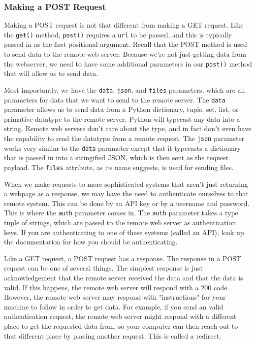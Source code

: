 \subsubsection{Making a POST Request}
Making a POST request is not that different from making a GET request. Like the \verb|get()| method, \verb|post()| requires a \verb|url| to be passed, and this is typically passed in as the first positional argument. Recall that the POST method is used to send data to the remote web server. Because we're not just getting data from the webserver, we need to have some additional parameters in our \verb|post()| method that will allow us to send data.\par
Most importantly, we have the \verb|data|, \verb|json|, and \verb|files| parameters, which are all parameters for data that we want to send to the remote server. The \verb|data| parameter allows us to send data from a Python dictionary, tuple, set, list, or primative datatype to the remote server. Python will typecast any data into a string. Remote web servers don't care about the type, and in fact don't even have the capability to read the datatype from a remote request. The \verb|json| parameter works very similar to the \verb|data| parameter except that it typecasts a dictionary that is passed in into a stringified JSON, which is then sent as the request payload. The \verb|files| attribute, as its name suggests, is used for sending files.\par
When we make requests to more sophisticated systems that aren't just returning a webpage as a response, we may have the need to authenticate ourselves to that remote system. This can be done by an API key or by a username and password. This is where the \verb|auth| parameter comes in. The \verb|auth| parameter takes a type tuple of strings, which are passed to the remote web server as authentication keys. If you are authenticating to one of these systems (called an API), look up the documentation for how you should be authenticating.\par
Like a GET request, a POST request has a response. The response in a POST request can be one of several things. The simplest response is just acknowledgement that the remote server received the data and that the data is valid. If this happens, the remote web server will respond with a 200 code. However, the remote web server may respond with "instructions" for your machine to follow in order to get data. For example, if you send an valid authentication request, the remote web server might respond with a different place to get the requested data from, so your computer can then reach out to that different place by placing another request. This is called a redirect.\par
